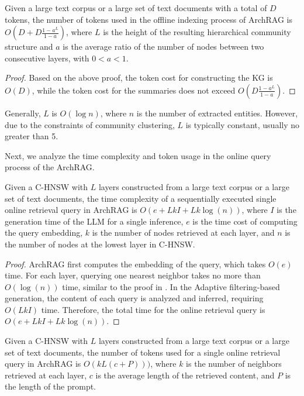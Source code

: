 \begin{lemma}
\label{lemma:index-cost}
Given a large text corpus or a large set of text documents with a total of $D$ tokens, the number of tokens used in the offline indexing process of ArchRAG is $O(D + D\frac{1-a^L}{1-a})$, where $L$ is the height of the resulting hierarchical community structure and $a$ is the average ratio of the number of nodes between two consecutive layers, with $0<a<1$.
\end{lemma}

\begin{proof}
    Based on the above proof, the token cost for constructing the KG is $O(D)$, while the token cost for the summaries does not exceed $O(D\frac{1-a^L}{1-a})$.
\end{proof}

Generally, $L$ is $O(\log n)$, where $n$ is the number of extracted entities. 
However, due to the constraints of community clustering, $L$ is typically constant, usually no greater than 5.


Next, we analyze the time complexity and token usage in the online query process of the ArchRAG.

\begin{lemma}
\label{lemma:query-time}
Given a C-HNSW with $L$ layers constructed from a large text corpus or a large set of text documents, the time complexity of a sequentially executed single online retrieval query in ArchRAG is $O(e+ LkI+Lk\log(n))$, where $I$ is the generation time of the LLM for a single inference, $e$ is the time cost of computing the query embedding, $k$ is the number of nodes retrieved at each layer, and $n$ is the number of nodes at the lowest layer in C-HNSW.
\end{lemma}

\begin{proof}
    ArchRAG first computes the embedding of the query, which takes $O(e)$ time. For each layer, querying one nearest neighbor takes no more than $O(\log(n))$ time, similar to the proof in \cite{malkov2018efficient}. In the Adaptive filtering-based generation, the content of each query is analyzed and inferred, requiring $O(LkI)$ time. Therefore, the total time for the online retrieval query is $O(e+ LkI+Lk\log(n))$.
\end{proof}

\begin{lemma}
\label{lemma:query-cost}
Given a C-HNSW with $L$ layers constructed from a large text corpus or a large set of text documents, the number of tokens used for a single online retrieval query in ArchRAG is $O(kL(c+P)))$, where $k$ is the number of neighbors retrieved at each layer, $c$ is the average length of the retrieved content, and $P$ is the length of the prompt.
\end{lemma}

